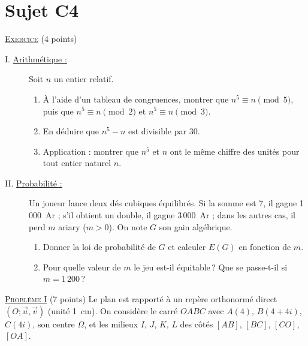 \section{Sujet C4}
\noindent \underline{\textsc{Exercice}} (4 points)
\begin{description}
\item[I. \underline{Arithm\'etique :}] Soit $n$ un entier relatif.
      \begin{enumerate}
      \item \`A l'aide d'un tableau de congruences, montrer que $n^5 \equiv n \pmod 5$, puis que $n^5 \equiv n \pmod 2$ et $n^5 \equiv n \pmod 3$.
      \item En d\'eduire que $n^5 - n$ est divisible par 30.
      \item Application : montrer que $n^5$ et $n$ ont le m\^eme chiffre des unit\'es pour tout entier naturel $n$.
      \end{enumerate}
\item[II. \underline{Probabilit\'e :}]
      Un joueur lance deux d\'es cubiques \'equilibr\'es. Si la somme est 7, il gagne 1\,000~Ar ; s'il obtient un double, il gagne
      3\,000~Ar ; dans les autres cas, il perd $m$ ariary ($m > 0$). On note $G$ son gain alg\'ebrique.
      \begin{enumerate}
      \item Donner la loi de probabilit\'e de $G$ et calculer $E(G)$ en fonction de $m$.
      \item Pour quelle valeur de $m$ le jeu est-il \'equitable\,? Que se passe-t-il si $m = 1\,200$\,?
      \end{enumerate}
\end{description}

\noindent \underline{\textsc{Probl\`eme I}} (7 points) \newline
Le plan est rapport\'e \`a un rep\`ere orthonorm\'e direct $(O ; \vec{u}, \vec{v})$ (unit\'e 1~cm). On consid\`ere le carr\'e $OABC$
avec $A(4)$, $B(4 + 4i)$, $C(4i)$, son centre $\Omega$, et les milieux $I$, $J$, $K$, $L$ des c\^ot\'es $[AB]$, $[BC]$, $[CO]$, $[OA]$.

